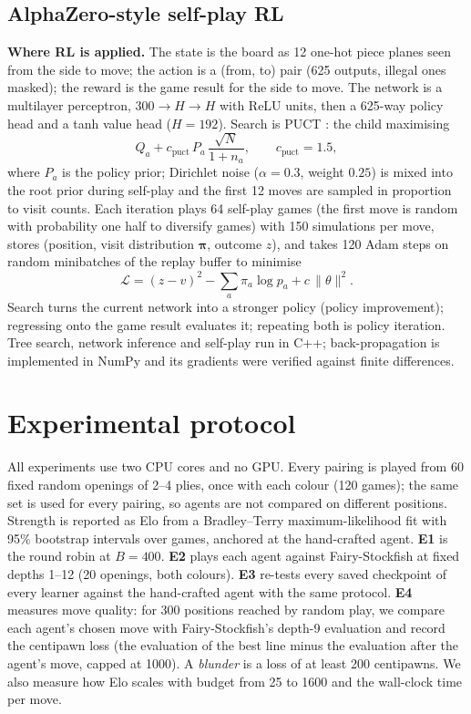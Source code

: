 \subsection{AlphaZero-style self-play RL}
\textbf{Where RL is applied.} The state is the board as 12 one-hot piece planes seen from the side to move; the action is a (from, to) pair (625 outputs, illegal ones masked); the reward is the game result for the side to move. The network is a multilayer perceptron, $300\to H\to H$ with ReLU units, then a 625-way policy head and a tanh value head ($H=192$). Search is PUCT \cite{silver2018}: the child maximising
\begin{equation}
Q_a + c_{\text{puct}}\,P_a\,\frac{\sqrt{N}}{1+n_a},\qquad c_{\text{puct}}=1.5,
\end{equation}
where $P_a$ is the policy prior; Dirichlet noise ($\alpha=0.3$, weight $0.25$) is mixed into the root prior during self-play and the first 12 moves are sampled in proportion to visit counts. Each iteration plays 64 self-play games (the first move is random with probability one half to diversify games) with 150 simulations per move, stores (position, visit distribution $\boldsymbol\pi$, outcome $z$), and takes 120 Adam steps \cite{kingma2015} on random minibatches of the replay buffer to minimise
\begin{equation}
\mathcal{L}=(z-v)^2-\sum_a \pi_a\log p_a+c\,\lVert\theta\rVert^2 .
\end{equation}
Search turns the current network into a stronger policy (policy improvement); regressing onto the game result evaluates it; repeating both is policy iteration. Tree search, network inference and self-play run in C++; back-propagation is implemented in NumPy and its gradients were verified against finite differences.

\section{Experimental protocol}
All experiments use two CPU cores and no GPU. Every pairing is played from 60 fixed random openings of 2--4 plies, once with each colour (120 games); the same set is used for every pairing, so agents are not compared on different positions. Strength is reported as Elo from a Bradley--Terry maximum-likelihood fit \cite{bradley1952} with 95\% bootstrap intervals over games, anchored at the hand-crafted agent. \textbf{E1} is the round robin at $B=400$. \textbf{E2} plays each agent against Fairy-Stockfish at fixed depths 1--12 (20 openings, both colours). \textbf{E3} re-tests every saved checkpoint of every learner against the hand-crafted agent with the same protocol. \textbf{E4} measures move quality: for 300 positions reached by random play, we compare each agent's chosen move with Fairy-Stockfish's depth-9 evaluation and record the centipawn loss (the evaluation of the best line minus the evaluation after the agent's move, capped at 1000). A \emph{blunder} is a loss of at least 200 centipawns. We also measure how Elo scales with budget from 25 to 1600 and the wall-clock time per move.
